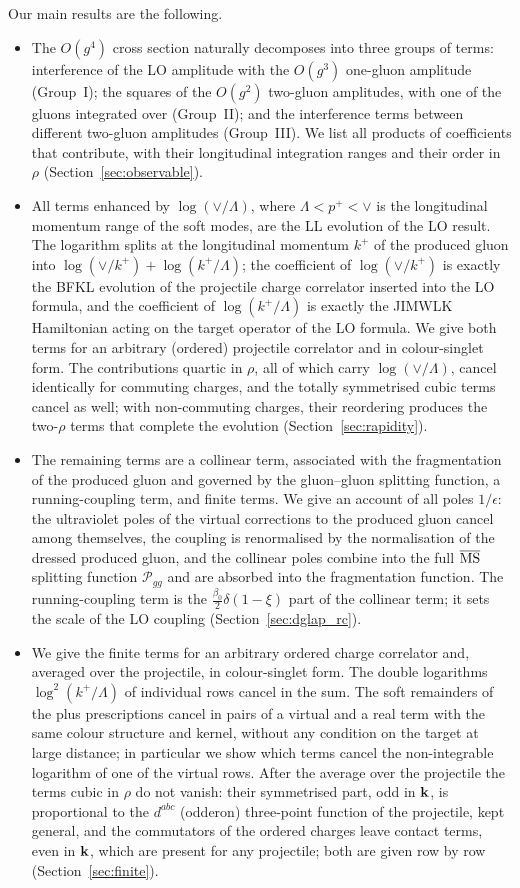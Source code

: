 Our main results are the following.
\begin{itemize}
\item The $O(g^4)$ cross section naturally decomposes into three groups of terms: interference of the LO amplitude with the $O(g^3)$ one-gluon amplitude (Group~I); the squares of the $O(g^2)$ two-gluon amplitudes, with one of the gluons integrated over (Group~II); and the interference terms between different two-gluon amplitudes (Group~III). We list all products of coefficients that contribute, with their longitudinal integration ranges and their order in $\rho$ (Section~\ref{sec:observable}).
\item All terms enhanced by $\log(\vee/\Lambda)$, where $\Lambda<p^+<\vee$ is the longitudinal momentum range of the soft modes, are the LL evolution of the LO result. The logarithm splits at the longitudinal momentum $k^+$ of the produced gluon into $\log(\vee/k^+)+\log(k^+/\Lambda)$; the coefficient of $\log(\vee/k^+)$ is exactly the BFKL evolution of the projectile charge correlator inserted into the LO formula, and the coefficient of $\log(k^+/\Lambda)$ is exactly the JIMWLK Hamiltonian acting on the target operator of the LO formula. We give both terms for an arbitrary (ordered) projectile correlator and in colour-singlet form. The contributions quartic in $\rho$, all of which carry $\log(\vee/\Lambda)$, cancel identically for commuting charges, and the totally symmetrised cubic terms cancel as well; with non-commuting charges, their reordering produces the two-$\rho$ terms that complete the evolution (Section~\ref{sec:rapidity}).
\item The remaining terms are a collinear term, associated with the fragmentation of the produced gluon and governed by the gluon--gluon splitting function, a running-coupling term, and finite terms. We give an account of all poles $1/\epsilon$: the ultraviolet poles of the virtual corrections to the produced gluon cancel among themselves, the coupling is renormalised by the normalisation of the dressed produced gluon, and the collinear poles combine into the full $\overline{\rm MS}$ splitting function $\mathcal P_{gg}$ and are absorbed into the fragmentation function. The running-coupling term is the $\frac{\beta_0}{2}\delta(1-\xi)$ part of the collinear term; it sets the scale of the LO coupling (Section~\ref{sec:dglap_rc}).
\item We give the finite terms for an arbitrary ordered charge correlator and, averaged over the projectile, in colour-singlet form. The double logarithms $\log^2(k^+/\Lambda)$ of individual rows cancel in the sum. The soft remainders of the plus prescriptions cancel in pairs of a virtual and a real term with the same colour structure and kernel, without any condition on the target at large distance; in particular we show which terms cancel the non-integrable logarithm of one of the virtual rows. After the average over the projectile the terms cubic in $\rho$ do not vanish: their symmetrised part, odd in $\mathbf{k}$, is proportional to the $d^{abc}$ (odderon) three-point function of the projectile, kept general, and the commutators of the ordered charges leave contact terms, even in $\mathbf{k}$, which are present for any projectile; both are given row by row (Section~\ref{sec:finite}).
\end{itemize}
